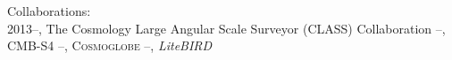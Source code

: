 \documentclass[a4paper]{resume}
\begin{document}

\begin{category}{\mbox{Collaborations:}}
\citemnobullet\\
2013--, The Cosmology Large Angular Scale Surveyor (CLASS) Collaboration
--, CMB-S4
--, \textsc{Cosmoglobe}
--, \textit{LiteBIRD}
\end{category}

%   
%   
%   




\end{document}
